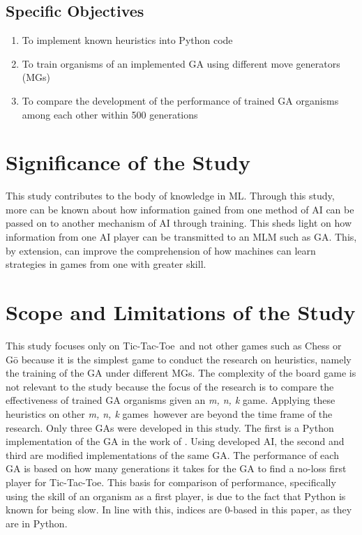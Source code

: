 \documentclass{strrespaper-trad}
\newcommand{\mnk}{\textit{m, n, k} game}
\newcommand{\mnkpl}{\textit{m, n, k} games}
\newcommand{\ttt}{Tic-Tac-Toe}
\begin{document}
			\subsection{Specific Objectives}
				\begin{enumerate}
					\item To implement known heuristics into Python code
					\item To train organisms of an implemented GA using different move generators (MGs)
					\item To compare the development of the performance of trained GA organisms among each other within 500 generations
				\end{enumerate}

		\section{Significance of the Study}
			This study contributes to the body of knowledge in ML.
			Through this study, more can be known about how information gained from one method of AI can be passed on to another mechanism of AI through training.
			This sheds light on how information from one AI player can be transmitted to an MLM such as GA.
			This, by extension, can improve the comprehension of how machines can learn strategies in games from one with greater skill.

		\section{Scope and Limitations of the Study}
			This study focuses only on \ttt\ and not other games such as Chess or G\=o because it is the simplest game to conduct the research on heuristics, namely the training of the GA under different MGs.
			The complexity of the board game is not relevant to the study because the focus of the research is to compare the effectiveness of trained GA organisms given an \mnk.
			Applying these heuristics on other \mnkpl\ however are beyond the time frame of the research.
			Only three GAs were developed in this study.
			The first is a Python implementation of the GA in the work of \textcite{bhattSearchNolossStrategies2008}.
			Using developed AI, the second and third are modified implementations of the same GA.
			The performance of each GA is based on how many generations it takes for the GA to find a no-loss first player for \ttt.
			This basis for comparison of performance, specifically using the skill of an organism as a first player, is due to the fact that Python is known for being slow.
			In line with this, indices are 0-based in this paper, as they are in Python.
\end{document}
